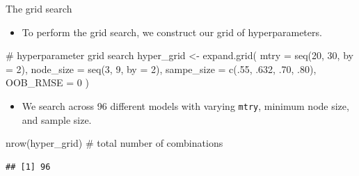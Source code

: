 \documentclass[
  10pt,
  ignorenonframetext,
]{beamer}
\newenvironment{Shaded}{}{}
\newcommand{\CommentTok}[1]{\textcolor[rgb]{0.00,0.50,0.00}{#1}}
\newcommand{\DataTypeTok}[1]{#1}
\newcommand{\DecValTok}[1]{#1}
\newcommand{\FloatTok}[1]{#1}
\newcommand{\KeywordTok}[1]{\textcolor[rgb]{0.00,0.00,1.00}{#1}}
\newcommand{\NormalTok}[1]{#1}
\newcommand{\StringTok}[1]{\textcolor[rgb]{0.00,0.50,0.50}{#1}}
\providecommand{\tightlist}{%
  \setlength{\itemsep}{0pt}\setlength{\parskip}{0pt}}
\begin{document}
\begin{frame}[fragile]{The grid search}
\protect\hypertarget{the-grid-search}{}

\begin{itemize}
\tightlist
\item
  To perform the grid search, we construct our grid of hyperparameters.
\end{itemize}

\begin{Shaded}
\begin{Highlighting}[]
\CommentTok{# hyperparameter grid search}
\NormalTok{hyper_grid <-}\StringTok{ }\KeywordTok{expand.grid}\NormalTok{(}
  \DataTypeTok{mtry       =} \KeywordTok{seq}\NormalTok{(}\DecValTok{20}\NormalTok{, }\DecValTok{30}\NormalTok{, }\DataTypeTok{by =} \DecValTok{2}\NormalTok{),}
  \DataTypeTok{node_size  =} \KeywordTok{seq}\NormalTok{(}\DecValTok{3}\NormalTok{, }\DecValTok{9}\NormalTok{, }\DataTypeTok{by =} \DecValTok{2}\NormalTok{),}
  \DataTypeTok{sampe_size =} \KeywordTok{c}\NormalTok{(.}\DecValTok{55}\NormalTok{, }\FloatTok{.632}\NormalTok{, }\FloatTok{.70}\NormalTok{, }\FloatTok{.80}\NormalTok{),}
  \DataTypeTok{OOB_RMSE   =} \DecValTok{0}
\NormalTok{)}
\end{Highlighting}
\end{Shaded}

\begin{itemize}
\tightlist
\item
  We search across 96 different models with varying \texttt{mtry},
  minimum node size, and sample size.
\end{itemize}

\begin{Shaded}
\begin{Highlighting}[]
\KeywordTok{nrow}\NormalTok{(hyper_grid) }\CommentTok{# total number of combinations}
\end{Highlighting}
\end{Shaded}

\begin{verbatim}
## [1] 96
\end{verbatim}

\end{frame}
\end{document}
